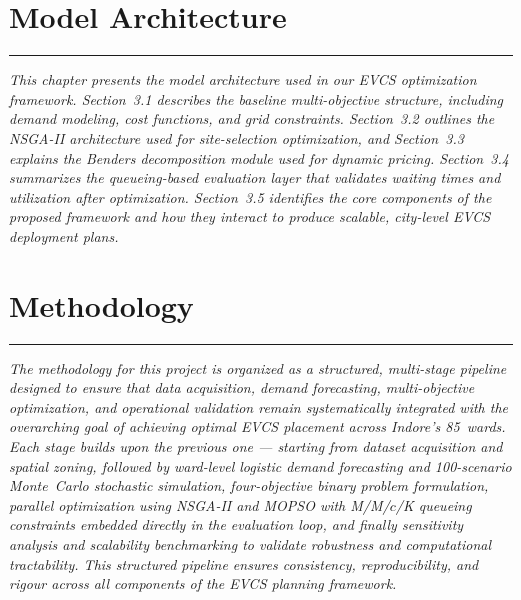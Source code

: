 \documentclass[12pt,phd,times]{pkmthesis}
\begin{document}
\label{chap:L_survey}
\newpage







\chapter{Model Architecture}
\vspace{-1cm}
\noindent \rule{6.6in}{0.01in}
\noindent \emph{
This chapter presents the model architecture used in our EVCS optimization framework.
Section~3.1 describes the baseline multi-objective structure, including demand modeling,
cost functions, and grid constraints. Section~3.2 outlines the NSGA-II architecture used
for site-selection optimization, and Section~3.3 explains the Benders decomposition module
used for dynamic pricing. Section~3.4 summarizes the queueing-based evaluation layer
that validates waiting times and utilization after optimization. Section~3.5 identifies the
core components of the proposed framework and how they interact to produce scalable,
city-level EVCS deployment plans.
}
\label{chap:problem_statement}

\chapter{Methodology}
\vspace{-1cm}
\noindent \rule{6.6in}{0.01in}
\noindent \emph{
The methodology for this project is organized as a structured, multi-stage
pipeline designed to ensure that data acquisition, demand forecasting,
multi-objective optimization, and operational validation remain systematically
integrated with the overarching goal of achieving optimal EVCS placement
across Indore's 85~wards. Each stage builds upon the previous one ---
starting from dataset acquisition and spatial zoning, followed by ward-level
logistic demand forecasting and 100-scenario Monte~Carlo stochastic
simulation, four-objective binary problem formulation, parallel optimization
using NSGA-II and MOPSO with M/M/$c$/K queueing constraints embedded
directly in the evaluation loop, and finally sensitivity analysis and
scalability benchmarking to validate robustness and computational
tractability. This structured pipeline ensures consistency, reproducibility,
and rigour across all components of the EVCS planning framework.}
\end{document}
